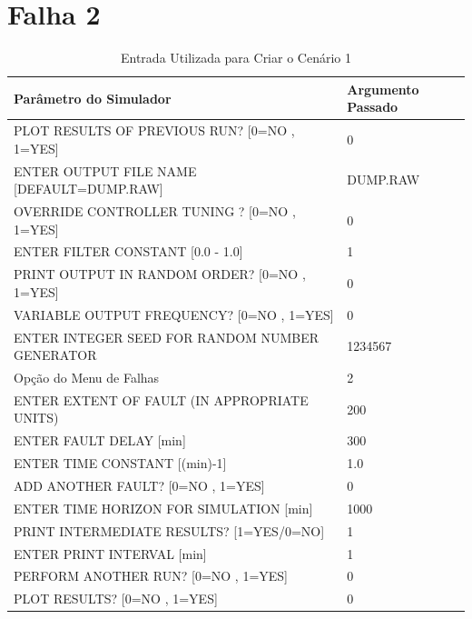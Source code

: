 \documentclass[journal]{IEEEtran}
\begin{document}





\appendices

\onecolumn
\section*{Falha 2}

\begin{table}[H]
	\centering
	\normalsize
	\begin{tabular}{|l|l|}
		\hline
		Parâmetro do Simulador											 		& Argumento Passado \\
		\hline\hline
		PLOT RESULTS OF PREVIOUS RUN? [0=NO , 1=YES] 		& 0 				\\ \hline
		ENTER OUTPUT FILE NAME [DEFAULT=DUMP.RAW] 			& DUMP.RAW	\\ \hline
		OVERRIDE CONTROLLER TUNING ? [0=NO , 1=YES] 		& 0 				\\ \hline
		ENTER FILTER CONSTANT [0.0 - 1.0]								& 1 				\\ \hline
		PRINT OUTPUT IN RANDOM ORDER? [0=NO , 1=YES]		& 0 				\\ \hline
		VARIABLE OUTPUT FREQUENCY? [0=NO , 1=YES]				& 0 				\\ \hline
		ENTER INTEGER SEED FOR RANDOM NUMBER GENERATOR	& 1234567		\\ \hline
		Opção do Menu de Falhas		 											& 2 				\\ \hline
		ENTER EXTENT OF FAULT (IN APPROPRIATE UNITS) 		& 200				\\ \hline
		ENTER FAULT DELAY [min]													& 300				\\ \hline
		ENTER TIME CONSTANT [(min)-1]										& 1.0				\\ \hline
		ADD ANOTHER FAULT? [0=NO , 1=YES]								& 0 				\\ \hline
		ENTER TIME HORIZON FOR SIMULATION [min]  				& 1000			\\ \hline
		PRINT INTERMEDIATE RESULTS? [1=YES/0=NO] 				& 1 				\\ \hline
		ENTER PRINT INTERVAL [min]						  				& 1 				\\ \hline
		PERFORM ANOTHER RUN? [0=NO , 1=YES] 	  				& 0 				\\ \hline
		PLOT RESULTS? [0=NO , 1=YES] 					  				& 0 				\\ \hline
	\end{tabular}
	\caption{Entrada Utilizada para Criar o Cenário 1}
\end{table}
\end{document}
